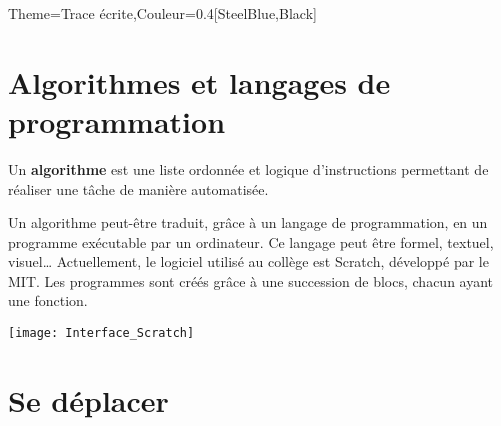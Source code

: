 \begin{Maquette}[Cours]{Theme={Trace écrite},Couleur={0.4[SteelBlue,Black]}}

   \section{Algorithmes et langages de programmation}

      \begin{definition*}{}
         Un {\bf algorithme} est une liste ordonnée et logique d'instructions permettant de réaliser une tâche de manière automatisée.
      \end{definition*}
   
      Un algorithme peut-être traduit, grâce à un langage de programmation, en un programme exécutable par un ordinateur. Ce langage peut être formel, textuel, visuel\dots{} Actuellement, le logiciel utilisé au collège est Scratch, développé par le MIT. Les programmes sont créés grâce à une succession de blocs, chacun ayant une fonction.
      \begin{center}
         \texttt{[image: Interface\_Scratch]}
      \end{center}
   
   
   \section{Se déplacer}
   

\end{Maquette}
